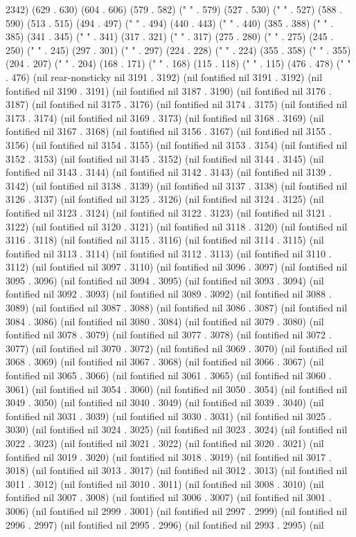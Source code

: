 2342) (629 . 630) (604 . 606) (579 . 582) (" " . 579) (527 . 530) (" " . 527) (588 . 590) (513 . 515) (494 . 497) (" " . 494) (440 . 443) (" " . 440) (385 . 388) (" " . 385) (341 . 345) ("  " . 341) (317 . 321) ("  " . 317) (275 . 280) ("   " . 275) (245 . 250) ("   " . 245) (297 . 301) ("  " . 297) (224 . 228) ("  " . 224) (355 . 358) (" " . 355) (204 . 207) (" " . 204) (168 . 171) (" " . 168) (115 . 118) (" " . 115) (476 . 478) (" " . 476) (nil rear-nonsticky nil 3191 . 3192) (nil fontified nil 3191 . 3192) (nil fontified nil 3190 . 3191) (nil fontified nil 3187 . 3190) (nil fontified nil 3176 . 3187) (nil fontified nil 3175 . 3176) (nil fontified nil 3174 . 3175) (nil fontified nil 3173 . 3174) (nil fontified nil 3169 . 3173) (nil fontified nil 3168 . 3169) (nil fontified nil 3167 . 3168) (nil fontified nil 3156 . 3167) (nil fontified nil 3155 . 3156) (nil fontified nil 3154 . 3155) (nil fontified nil 3153 . 3154) (nil fontified nil 3152 . 3153) (nil fontified nil 3145 . 3152) (nil fontified nil 3144 . 3145) (nil fontified nil 3143 . 3144) (nil fontified nil 3142 . 3143) (nil fontified nil 3139 . 3142) (nil fontified nil 3138 . 3139) (nil fontified nil 3137 . 3138) (nil fontified nil 3126 . 3137) (nil fontified nil 3125 . 3126) (nil fontified nil 3124 . 3125) (nil fontified nil 3123 . 3124) (nil fontified nil 3122 . 3123) (nil fontified nil 3121 . 3122) (nil fontified nil 3120 . 3121) (nil fontified nil 3118 . 3120) (nil fontified nil 3116 . 3118) (nil fontified nil 3115 . 3116) (nil fontified nil 3114 . 3115) (nil fontified nil 3113 . 3114) (nil fontified nil 3112 . 3113) (nil fontified nil 3110 . 3112) (nil fontified nil 3097 . 3110) (nil fontified nil 3096 . 3097) (nil fontified nil 3095 . 3096) (nil fontified nil 3094 . 3095) (nil fontified nil 3093 . 3094) (nil fontified nil 3092 . 3093) (nil fontified nil 3089 . 3092) (nil fontified nil 3088 . 3089) (nil fontified nil 3087 . 3088) (nil fontified nil 3086 . 3087) (nil fontified nil 3084 . 3086) (nil fontified nil 3080 . 3084) (nil fontified nil 3079 . 3080) (nil fontified nil 3078 . 3079) (nil fontified nil 3077 . 3078) (nil fontified nil 3072 . 3077) (nil fontified nil 3070 . 3072) (nil fontified nil 3069 . 3070) (nil fontified nil 3068 . 3069) (nil fontified nil 3067 . 3068) (nil fontified nil 3066 . 3067) (nil fontified nil 3065 . 3066) (nil fontified nil 3061 . 3065) (nil fontified nil 3060 . 3061) (nil fontified nil 3054 . 3060) (nil fontified nil 3050 . 3054) (nil fontified nil 3049 . 3050) (nil fontified nil 3040 . 3049) (nil fontified nil 3039 . 3040) (nil fontified nil 3031 . 3039) (nil fontified nil 3030 . 3031) (nil fontified nil 3025 . 3030) (nil fontified nil 3024 . 3025) (nil fontified nil 3023 . 3024) (nil fontified nil 3022 . 3023) (nil fontified nil 3021 . 3022) (nil fontified nil 3020 . 3021) (nil fontified nil 3019 . 3020) (nil fontified nil 3018 . 3019) (nil fontified nil 3017 . 3018) (nil fontified nil 3013 . 3017) (nil fontified nil 3012 . 3013) (nil fontified nil 3011 . 3012) (nil fontified nil 3010 . 3011) (nil fontified nil 3008 . 3010) (nil fontified nil 3007 . 3008) (nil fontified nil 3006 . 3007) (nil fontified nil 3001 . 3006) (nil fontified nil 2999 . 3001) (nil fontified nil 2997 . 2999) (nil fontified nil 2996 . 2997) (nil fontified nil 2995 . 2996) (nil fontified nil 2993 . 2995) (nil 